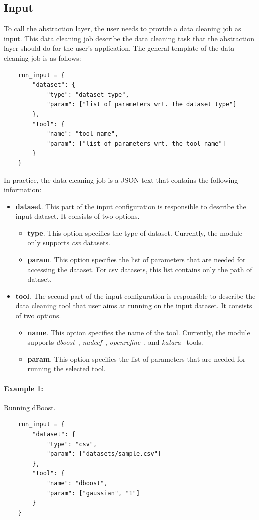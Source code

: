 \documentclass[12pt]{article}
\begin{document}
\subsection{Input}
To call the abstraction layer, the user needs to provide a data cleaning job as input. This data cleaning job describe the data cleaning task that the abstraction layer should do for the user's application. The general template of the data cleaning job is as follows:
\begin{lstlisting}
	run_input = {
		"dataset": {
			"type": "dataset type",
			"param": ["list of parameters wrt. the dataset type"]
		},
		"tool": {
			"name": "tool name",
			"param": ["list of parameters wrt. the tool name"]
		}
	}
\end{lstlisting}
In practice, the data cleaning job is a JSON text that contains the following information: 
\begin{itemize}
	\item \textbf{dataset}. This part of the input configuration is responsible to describe the input dataset. It consists of two options.
	\begin{itemize}
		\item \textbf{type}. This option specifies the type of dataset. Currently, the module only supports \emph{csv} datasets.
		\item \textbf{param}. This option specifies the list of parameters that are needed for accessing the dataset. For csv datasets, this list contains only the path of dataset.
	\end{itemize}
	\item \textbf{tool}. The second part of the input configuration is responsible to describe the data cleaning tool that user aims at running on the input dataset. It consists of two options.
	\begin{itemize}
		\item\textbf{name}. This option specifies the name of the tool. Currently, the module supports \emph{dboost}~\cite{mariet2016outlier}, \emph{nadeef}~\cite{dallachiesa2013nadeef}, \emph{openrefine}~\cite{verborgh2013using}, and \emph{katara}~\cite{chu2015katara} tools.
		\item \textbf{param}. This option specifies the list of parameters that are needed for running the selected tool.		
	\end{itemize}

\end{itemize}

\paragraph{Example 1:} Running dBoost.
\begin{lstlisting}
	run_input = {
		"dataset": {
			"type": "csv",
			"param": ["datasets/sample.csv"]
		},
		"tool": {
			"name": "dboost",
			"param": ["gaussian", "1"]
		}
	}
\end{lstlisting}
\end{document}
